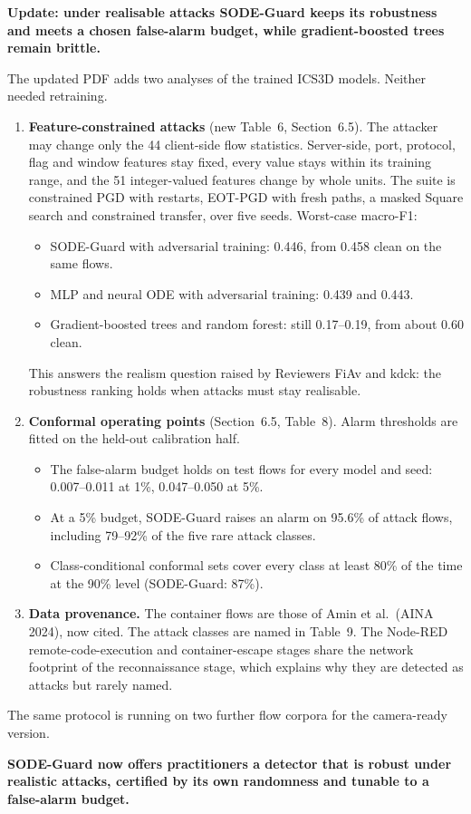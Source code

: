 \documentclass[11pt]{article}
\begin{document}
{\large\bfseries Update: under realisable attacks SODE-Guard keeps its robustness and
meets a chosen false-alarm budget, while gradient-boosted trees remain brittle.}

\medskip
The updated PDF adds two analyses of the trained ICS3D models. Neither needed
retraining.

\begin{enumerate}
\item \textbf{Feature-constrained attacks} (new Table~6, Section~6.5). The attacker
may change only the 44 client-side flow statistics. Server-side, port, protocol,
flag and window features stay fixed, every value stays within its training range,
and the 51 integer-valued features change by whole units. The suite is constrained
PGD with restarts, EOT-PGD with fresh paths, a masked Square search and constrained
transfer, over five seeds. Worst-case macro-F1:
\begin{itemize}
\item SODE-Guard with adversarial training: 0.446, from 0.458 clean on the same flows.
\item MLP and neural ODE with adversarial training: 0.439 and 0.443.
\item Gradient-boosted trees and random forest: still 0.17--0.19, from about 0.60 clean.
\end{itemize}
This answers the realism question raised by Reviewers FiAv and kdck: the robustness
ranking holds when attacks must stay realisable.
\item \textbf{Conformal operating points} (Section~6.5, Table~8). Alarm thresholds are
fitted on the held-out calibration half.
\begin{itemize}
\item The false-alarm budget holds on test flows for every model and seed:
0.007--0.011 at 1\%, 0.047--0.050 at 5\%.
\item At a 5\% budget, SODE-Guard raises an alarm on 95.6\% of attack flows,
including 79--92\% of the five rare attack classes.
\item Class-conditional conformal sets cover every class at least 80\% of the time at
the 90\% level (SODE-Guard: 87\%).
\end{itemize}
\item \textbf{Data provenance.} The container flows are those of Amin et al.\ (AINA
2024), now cited. The attack classes are named in Table~9. The Node-RED
remote-code-execution and container-escape stages share the network footprint of
the reconnaissance stage, which explains why they are detected as attacks but
rarely named.
\end{enumerate}

The same protocol is running on two further flow corpora for the camera-ready version.

\medskip
\textbf{SODE-Guard now offers practitioners a detector that is robust under realistic
attacks, certified by its own randomness and tunable to a false-alarm budget.}
\end{document}
